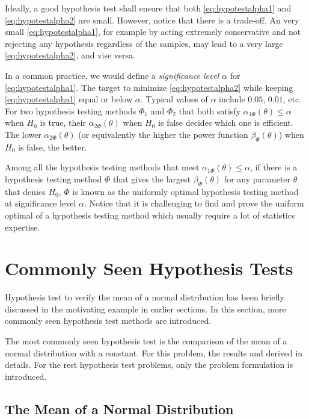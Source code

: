 Ideally, a good hypothesis test shall ensure that both \eqref{eq:hypotestalpha1} and \eqref{eq:hypotestalpha2} are small. However, notice that there is a trade-off. An very small \eqref{eq:hypotestalpha1}, for example by acting extremely conservative and not rejecting any hypothesis regardless of the samples, may lead to a very large \eqref{eq:hypotestalpha2}, and vise versa. 

In a common practice, we would define a \textit{significance level} $\alpha$ for \eqref{eq:hypotestalpha1}. The target to minimize \eqref{eq:hypotestalpha2} while keeping \eqref{eq:hypotestalpha1} equal or below $\alpha$. Typical values of $\alpha$ include $0.05$, $0.01$, etc. For two hypothesis testing methods $\Phi_1$ and $\Phi_2$ that both satisfy $\alpha_{1\Phi}(\theta) \leq \alpha$ when $H_0$ is true, their $\alpha_{2\Phi}(\theta)$ when $H_0$ is false decides which one is efficient. The lower $\alpha_{2\Phi}(\theta)$ (or equivalently the higher the power function $\beta_\Phi(\theta)$) when $H_0$ is false, the better.

Among all the hypothesis testing methods that meet $\alpha_{1\Phi}(\theta) \leq \alpha$, if there is a hypothesis testing method $\Phi$ that gives the largest $\beta_\Phi(\theta)$ for any parameter $\theta$ that denies $H_0$, $\Phi$ is known as the uniformly optimal hypothesis testing method at significance level $\alpha$. Notice that it is challenging to find and prove the uniform optimal of a hypothesis testing method which usually require a lot of statistics expertise.

\section{Commonly Seen Hypothesis Tests}

Hypothesis test to verify the mean of a normal distribution has been briefly discussed in the motivating example in earlier sections. In this section, more commonly seen hypothesis test methods are introduced. 

The most commonly seen hypothesis test is the comparison of the mean of a normal distribution with a constant. For this problem, the results and derived in details. For the rest hypothesis test problems, only the problem formulation is introduced.

\subsection{The Mean of a Normal Distribution}

